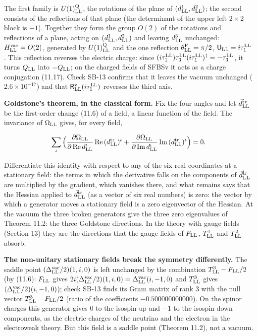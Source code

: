 \documentclass[
  10pt,
]{article}
\begin{document}
The first family is \(U(1)^{\rm Q}_{\rm LL}\), the rotations of the
plane of \((d^1_{\rm LL},d^2_{\rm LL})\); the second consists of the
reflections of that plane (the determinant of the upper left
\(2\times2\) block is \(-1\)). Together they form the group \(O(2)\) of
the rotations and reflections of a plane, acting on
\((d^1_{\rm LL},d^2_{\rm LL})\) and leaving \(d^3_{\rm LL}\) unchanged:
\(H^{\rm vac}_{\rm LL}=O(2)\), generated by \(U(1)^{\rm Q}_{\rm LL}\)
and the one reflection \(\theta^{\rm F}_{\rm LL}=\pi/2\),
\(\mathsf U_{\rm LL}=i\tau^{\rm LL}_1\). This reflection reverses the
electric charge: since
\((i\tau^{\rm LL}_1)\tau^{\rm LL}_3(i\tau^{\rm LL}_1)^\dagger=-\tau^{\rm LL}_3\),
it turns \(Q_{\rm LL}\) into \(-Q_{\rm LL}\); on the charged fields of
SFBSv it acts as a charge conjugation (11.17). Check SB-13 confirms that
it leaves the vacuum unchanged (\(2.6\times10^{-17}\)) and that
\(\mathsf R^{\rm v}_{\rm LL}(i\tau^{\rm LL}_1)\) reverses the third
axis.

\textbf{Goldstone's theorem, in the classical form.} Fix the four angles
and let \(\vec d^{\rm tr}_{\rm LL}\) be the first-order change (11.6) of
a field, a linear function of the field. The invariance of
\(\Omega_{\rm LL}\) gives, for every field,

\[\sum_\iota\Big(\frac{\partial\Omega_{\rm LL}}{\partial\,{\rm Re}\,d^\iota_{\rm LL}}\,{\rm Re}\,(d^{\rm tr}_{\rm LL})^\iota+\frac{\partial\Omega_{\rm LL}}{\partial\,{\rm Im}\,d^\iota_{\rm LL}}\,{\rm Im}\,(d^{\rm tr}_{\rm LL})^\iota\Big)=0 .\]

Differentiate this identity with respect to any of the six real
coordinates at a stationary field: the terms in which the derivative
falls on the components of \(\vec d^{\rm tr}_{\rm LL}\) are multiplied
by the gradient, which vanishes there, and what remains says that the
Hessian applied to \(\vec d^{\rm tr}_{\rm LL}\) (as a vector of six real
numbers) is zero: the vector by which a generator moves a stationary
field is a zero eigenvector of the Hessian. At the vacuum the three
broken generators give the three zero eigenvalues of Theorem 11.2: the
three Goldstone directions. In the theory with gauge fields (Section 13)
they are the directions that the gauge fields of \(F_{\rm LL}\),
\(T^1_{\rm LL}\) and \(T^2_{\rm LL}\) absorb.

\textbf{The non-unitary stationary fields break the symmetry
differently.} The saddle point \((\Delta^{\rm vac}_{\rm LL}/2)(1,i,0)\)
is left unchanged by the combination \(T^3_{\rm LL}-F_{\rm LL}/2\) (by
(11.6): \(F_{\rm LL}\) gives
\(2i(\Delta^{\rm vac}_{\rm LL}/2)(1,i,0)=\Delta^{\rm vac}_{\rm LL}(i,-1,0)\)
and \(T^3_{\rm LL}\) gives \((\Delta^{\rm vac}_{\rm LL}/2)(i,-1,0)\));
check SB-13 finds its Gram matrix of rank 3 with the null vector
\(T^3_{\rm LL}-F_{\rm LL}/2\) (ratio of the coefficients
\(-0.500000000000\)). On the spinor charges this generator gives 0 to
the isospin-up and \(-1\) to the isospin-down components, as the
electric charges of the neutrino and the electron in the electroweak
theory. But this field is a saddle point (Theorem 11.2), not a vacuum.
\end{document}
